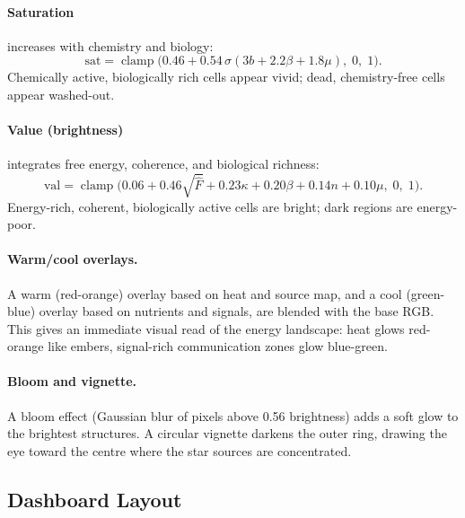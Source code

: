 \documentclass[12pt,a4paper]{article}
\DeclareMathOperator{\clamp}{clamp}
\begin{document}
\paragraph{Saturation} increases with chemistry and biology:
\[
  \text{sat} = \clamp\!\bigl(0.46 + 0.54\,\sigma(3b + 2.2\beta
    + 1.8\mu),\;0,\;1\bigr).
\]
Chemically active, biologically rich cells appear vivid;
dead, chemistry-free cells appear washed-out.

\paragraph{Value (brightness)} integrates free energy, coherence,
and biological richness:
\[
  \text{val} = \clamp\!\bigl(0.06 + 0.46\sqrt{\hat{F}} + 0.23\kappa
    + 0.20\beta + 0.14n + 0.10\mu,\;0,\;1\bigr).
\]
Energy-rich, coherent, biologically active cells are bright;
dark regions are energy-poor.

\paragraph{Warm/cool overlays.}
A warm (red-orange) overlay based on heat and source map,
and a cool (green-blue) overlay based on nutrients and signals,
are blended with the base RGB.
This gives an immediate visual read of the energy landscape:
heat glows red-orange like embers,
signal-rich communication zones glow blue-green.

\paragraph{Bloom and vignette.}
A bloom effect (Gaussian blur of pixels above 0.56 brightness)
adds a soft glow to the brightest structures.
A circular vignette darkens the outer ring, drawing the eye
toward the centre where the star sources are concentrated.

\subsection{Dashboard Layout}
\end{document}
